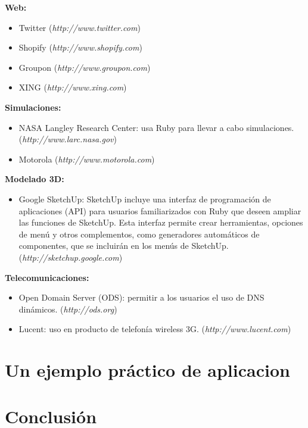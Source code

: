 \documentclass{article}
\begin{document}
\textbf{Web:}
\begin{itemize}
	\itemsep=1pt \topsep=0pt \partopsep=0pt \parskip=0pt \parsep=0pt
	\item Twitter (\textit{http://www.twitter.com})
	\item Shopify (\textit{http://www.shopify.com})
	\item Groupon (\textit{http://www.groupon.com})
	\item XING (\textit{http://www.xing.com})
\end{itemize}
\medskip

\textbf{Simulaciones:}
\begin{itemize}
	\itemsep=1pt \topsep=0pt \partopsep=0pt \parskip=0pt \parsep=0pt
	\item NASA Langley Research Center: usa Ruby para llevar a cabo simulaciones. (\textit{http://www.larc.nasa.gov})
	\item Motorola (\textit{http://www.motorola.com})
\end{itemize}
\medskip

\textbf{Modelado 3D:}
\begin{itemize}
	\itemsep=1pt \topsep=0pt \partopsep=0pt \parskip=0pt \parsep=0pt
	\item Google SketchUp: SketchUp incluye una interfaz de programación de aplicaciones (API) para usuarios familiarizados con Ruby que deseen ampliar las funciones de SketchUp. Esta interfaz permite crear herramientas, opciones de menú y otros complementos, como generadores automáticos de componentes, que se incluirán en los menús de SketchUp. (\textit{http://sketchup.google.com})
\end{itemize}
\medskip

\textbf{Telecomunicaciones:}
\begin{itemize}
	\itemsep=1pt \topsep=0pt \partopsep=0pt \parskip=0pt \parsep=0pt
	\item Open Domain Server (ODS): permitir a los usuarios el uso de DNS dinámicos. (\textit{http://ods.org})
	\item Lucent: uso en producto de telefonía wireless 3G. (\textit{http://www.lucent.com})
\end{itemize}
\medskip




\section{Un ejemplo práctico de aplicacion}





\section{Conclusión}
\end{document}
